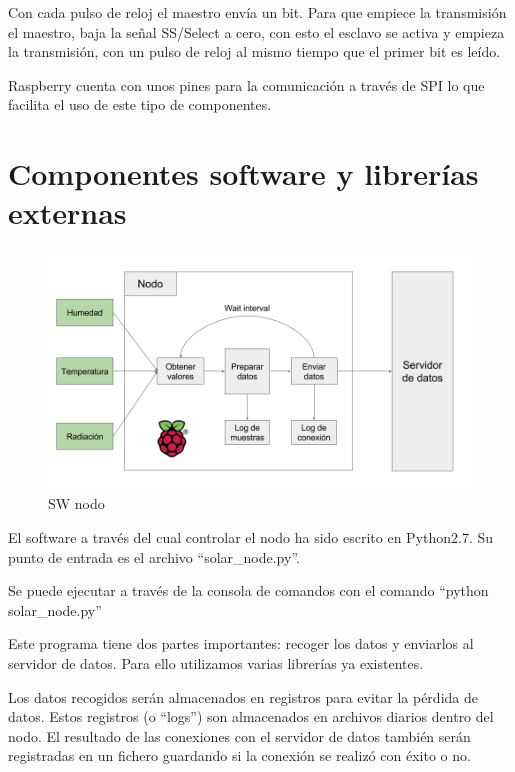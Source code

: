 Con cada pulso de reloj el maestro envía un bit. Para que empiece la transmisión el maestro, baja la señal SS/Select a cero, con esto el esclavo se activa y empieza la transmisión, con un pulso de reloj al mismo tiempo que el primer bit es leído.

Raspberry cuenta con unos pines para la comunicación a través de SPI lo que facilita el uso de este tipo de componentes.

\section{Componentes software y librerías externas}
\label{makereference2.4}

\begin{figure}[htb]
	\begin{center}
		\includegraphics[width=15cm]{figures/diagrama_nodo.png}
		\caption{SW nodo \label{diagrama_sw_nodo}}
	\end{center}
\end{figure}

El software a través del cual controlar el nodo ha sido escrito en Python2.7. Su punto de entrada es el archivo ``solar\_node.py''.

Se puede ejecutar a través de la consola de comandos con el comando ``python solar\_node.py''

Este programa tiene dos partes importantes: recoger los datos y enviarlos al servidor de datos. Para ello utilizamos varias librerías ya existentes.

Los datos recogidos serán almacenados en registros para evitar la pérdida de datos. Estos registros (o ``logs'') son almacenados en archivos diarios dentro del nodo. El resultado de las conexiones con el servidor de datos también serán registradas en un fichero guardando si la conexión se realizó con éxito o no.

